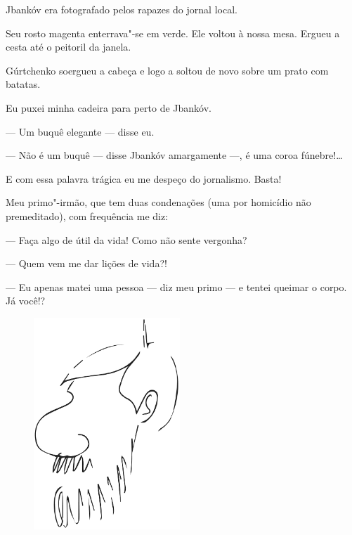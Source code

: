 Jbankóv era fotografado pelos rapazes do jornal local.

Seu rosto magenta enterrava"-se em verde. Ele voltou à nossa mesa. Ergueu
a cesta até o peitoril da janela.

Gúrtchenko soergueu a cabeça e logo a soltou de novo sobre um prato com
batatas.

Eu puxei minha cadeira para perto de Jbankóv.

--- Um buquê elegante --- disse eu.

--- Não é um buquê --- disse Jbankóv amargamente ---, é uma coroa
fúnebre!\ldots{}

E com essa palavra trágica eu me despeço do jornalismo. Basta!

Meu primo"-irmão, que tem duas condenações (uma por homicídio não
premeditado), com frequência me diz:

--- Faça algo de útil da vida! Como não sente vergonha?

--- Quem vem me dar lições de vida?!

--- Eu apenas matei uma pessoa --- diz meu primo --- e tentei queimar o
corpo. Já você!?


\clearpage
\thispagestyle{empty}


\movetoevenpage
\thispagestyle{empty}
\begin{vplace}[1]
\begin{figure}[!ht]
\centering
  \includegraphics[width=55mm]{./imgs/autocharge.jpg}
 \end{figure}
\end{vplace}

\clearpage
\thispagestyle{empty}

